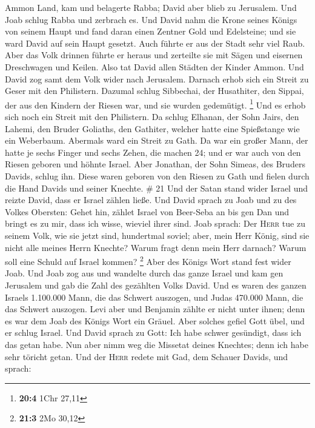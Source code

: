 Ammon Land, kam und belagerte Rabba; David aber blieb zu Jerusalem. Und
Joab schlug Rabba und zerbrach es.  Und David nahm die
Krone seines Königs von seinem Haupt und fand daran einen Zentner Gold
und Edelsteine; und sie ward David auf sein Haupt gesetzt. Auch führte
er aus der Stadt sehr viel Raub.  Aber das Volk drinnen
führte er heraus und zerteilte sie mit Sägen und eisernen Dreschwagen
und Keilen. Also tat David allen Städten der Kinder Ammon. Und David zog
samt dem Volk wider nach Jerusalem.  Darnach erhob sich
ein Streit zu Geser mit den Philistern. Dazumal schlug Sibbechai, der
Husathiter, den Sippai, der aus den Kindern der Riesen war, und sie
wurden gedemütigt. \footnote{\textbf{20:4} 1Chr 27,11} 
Und es erhob sich noch ein Streit mit den Philistern. Da schlug Elhanan,
der Sohn Jairs, den Lahemi, den Bruder Goliaths, den Gathiter, welcher
hatte eine Spießstange wie ein Weberbaum.  Abermals ward
ein Streit zu Gath. Da war ein großer Mann, der hatte je sechs Finger
und sechs Zehen, die machen 24; und er war auch von den Riesen geboren
 und höhnte Israel. Aber Jonathan, der Sohn Simeas, des
Bruders Davids, schlug ihn.  Diese waren geboren von den
Riesen zu Gath und fielen durch die Hand Davids und seiner Knechte. \#
21  Und der Satan stand wider Israel und reizte David,
dass er Israel zählen ließe.  Und David sprach zu Joab und
zu des Volkes Obersten: Gehet hin, zählet Israel von Beer-Seba an bis
gen Dan und bringt es zu mir, dass ich wisse, wieviel ihrer sind.
 Joab sprach: Der \textsc{Herr} tue zu seinem Volk, wie
sie jetzt sind, hundertmal soviel; aber, mein Herr König, sind sie nicht
alle meines Herrn Knechte? Warum fragt denn mein Herr darnach? Warum
soll eine Schuld auf Israel kommen? \footnote{\textbf{21:3} 2Mo 30,12}
 Aber des Königs Wort stand fest wider Joab. Und Joab zog
aus und wandelte durch das ganze Israel und kam gen Jerusalem
 und gab die Zahl des gezählten Volks David. Und es waren
des ganzen Israels 1.100.000 Mann, die das Schwert auszogen, und Judas
470.000 Mann, die das Schwert auszogen.  Levi aber und
Benjamin zählte er nicht unter ihnen; denn es war dem Joab des Königs
Wort ein Gräuel.  Aber solches gefiel Gott übel, und er
schlug Israel.  Und David sprach zu Gott: Ich habe schwer
gesündigt, dass ich das getan habe. Nun aber nimm weg die Missetat
deines Knechtes; denn ich habe sehr töricht getan.  Und
der \textsc{Herr} redete mit Gad, dem Schauer Davids, und sprach:
